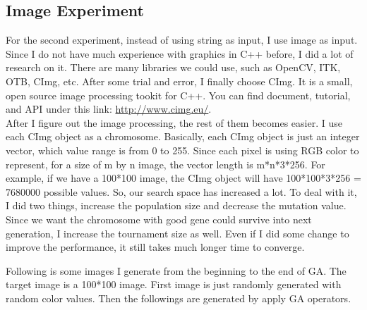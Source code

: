 \documentclass{article}
\begin{document}
\subsection{Image Experiment}
For the second experiment, instead of using string as input, I use image as input. Since I do not have much experience with graphics in C++ before, I did a lot of research on it. There are many libraries we could use, such as OpenCV, ITK, OTB, CImg, etc. After some trial and error, I finally choose CImg. It is a small, open source image processing tookit for C++. You can find document, tutorial, and API under this link: \url{http://www.cimg.eu/}. \\

After I figure out the image processing, the rest of them becomes easier. I use each CImg object as a chromosome. Basically, each CImg object is just an integer vector, which value range is from 0 to 255. Since each pixel is using RGB color to represent, for a size of m by n image, the vector length is m*n*3*256. For example, if we have a 100*100 image, the CImg object will have 100*100*3*256 = 7680000 possible values. So, our search space has increased a lot. To deal with it, I did two things, increase the population size and decrease the mutation value. Since we want the chromosome with good gene could survive into next generation, I increase the tournament size as well. Even if I did some change to improve the performance, it still takes much longer time to converge.

Following is some images I generate from the beginning to the end of GA. The target image is a 100*100 image. First image is just randomly generated with random color values. Then the followings are generated by apply GA operators.
\end{document}
